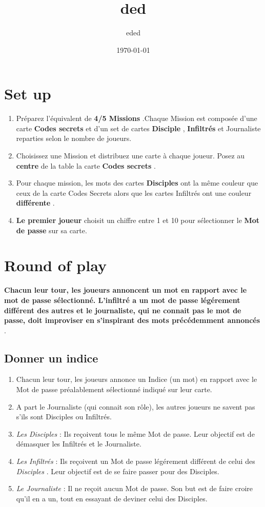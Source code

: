 \documentclass{article}%
\title{ded}%
\author{eded}%
\date{\today}%
\begin{document}
%
\pagestyle{empty}%
\normalsize%
\maketitle%
\section{ Set up
}%
\label{sec:Setup}%
\begin{enumerate}%
\item%
%
  Préparez l'équivalent de %
\textbf{4/5 Missions}%
.Chaque Mission est composée d'une carte %
\textbf{Codes secrets}%
  et d'un set de cartes %
\textbf{Disciple}%
,%
\textbf{ Infiltrés}%
  et Journaliste reparties selon le nombre de joueurs.
%
\item%
%
  Choisissez une Mission et distribuez une carte à chaque joueur. Posez au %
\textbf{centre}%
  de la table la carte %
\textbf{Codes secrets}%
.
%
\item%
%
  Pour chaque mission, les mots des cartes %
\textbf{Disciples}%
  ont la même couleur que ceux de la carte Codes Secrets alors que les cartes Infiltrés ont une couleur %
\textbf{différente}%
.
%
\item%
%
\textbf{Le premier joueur}%
  choisit un chiffre entre 1 et 10 pour sélectionner le %
\textbf{Mot de passe}%
  sur sa carte.
%
\end{enumerate}

%
\section{ Round of play
}%
\label{sec:Roundofplay}%
\textbf{Chacun leur tour, les joueurs annoncent un mot en rapport avec le mot de passe sélectionné. L'infiltré a un mot de passe légérement différent des autres et le journaliste, qui ne connait pas le mot de passe, doit improviser en s'inspirant des mots précédemment annoncés}%
.


%
\subsection{ Donner un indice
}%
\label{subsec:Donnerunindice}%
\begin{enumerate}%
\item%
%
  Chacun leur tour, les joueurs annonce un Indice (un mot) en rapport avec le Mot de passe préalablement sélectionné indiqué sur leur carte.
%
\item%
%
  A part le Journaliste (qui connait son rôle), les autres joueurs ne savent pas s'ils sont Disciples ou Infiltrés.
%
\item%
%
\textit{Les Disciples}%
  : Ils reçoivent tous le même Mot de passe. Leur objectif est de démasquer les Infiltrés et le Journaliste.
%
\item%
%
\textit{Les Infiltrés}%
  : Ils reçoivent un Mot de passe légérement différent de celui des %
\textit{Disciples}%
. Leur objectif est de se faire passer pour des Disciples.
%
\item%
%
\textit{Le Journaliste}%
  : Il ne reçoit aucun Mot de passe. Son but est de faire croire qu'il en a un, tout en essayant de deviner celui des Disciples.
%
\end{enumerate}
\end{document}
